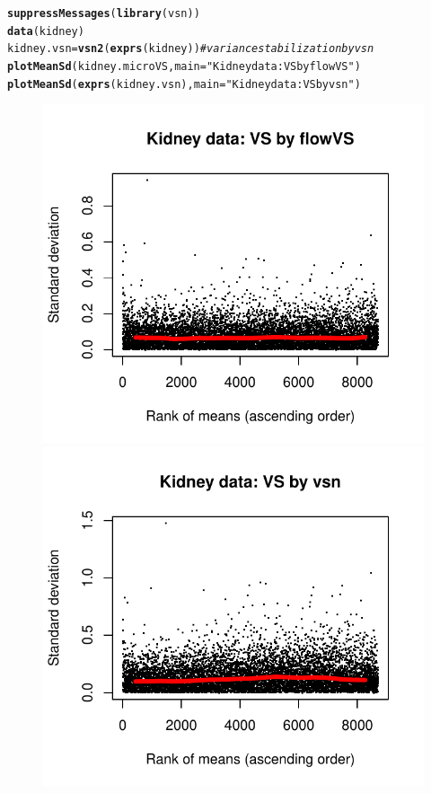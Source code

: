 \documentclass{article}\usepackage[]{graphicx}\usepackage[]{color}
\makeatletter
\def\maxwidth{ %
  \ifdim\Gin@nat@width>\linewidth
    \linewidth
  \else
    \Gin@nat@width
  \fi
}
\newcommand{\hlstr}[1]{\textcolor[rgb]{0.192,0.494,0.8}{#1}}%
\newcommand{\hlcom}[1]{\textcolor[rgb]{0.678,0.584,0.686}{\textit{#1}}}%
\newcommand{\hlstd}[1]{\textcolor[rgb]{0.345,0.345,0.345}{#1}}%
\newcommand{\hlkwb}[1]{\textcolor[rgb]{0.69,0.353,0.396}{#1}}%
\newcommand{\hlkwc}[1]{\textcolor[rgb]{0.333,0.667,0.333}{#1}}%
\newcommand{\hlkwd}[1]{\textcolor[rgb]{0.737,0.353,0.396}{\textbf{#1}}}%
\newenvironment{kframe}{%
 \def\at@end@of@kframe{}%
 \ifinner\ifhmode%
  \def\at@end@of@kframe{\end{minipage}}%
  \begin{minipage}{\columnwidth}%
 \fi\fi%
 \def\FrameCommand##1{\hskip\@totalleftmargin \hskip-\fboxsep
 \colorbox{shadecolor}{##1}\hskip-\fboxsep
     \hskip-\linewidth \hskip-\@totalleftmargin \hskip\columnwidth}%
 \MakeFramed {\advance\hsize-\width
   \@totalleftmargin\z@ \linewidth\hsize
   \@setminipage}}%
 {\par\unskip\endMakeFramed%
 \at@end@of@kframe}
\newenvironment{knitrout}{}{} %
\makeatother
\begin{document}
\begin{knitrout}
\color{fgcolor}\begin{kframe}
\begin{alltt}
\hlkwd{suppressMessages}\hlstd{(}\hlkwd{library}\hlstd{(vsn))}
\hlkwd{data}\hlstd{(kidney)}
\hlstd{kidney.vsn} \hlkwb{=} \hlkwd{vsn2}\hlstd{(}\hlkwd{exprs}\hlstd{(kidney))} \hlcom{#variance stabilization by vsn}
\hlkwd{plotMeanSd}\hlstd{(kidney.microVS,} \hlkwc{main}\hlstd{=}\hlstr{"Kidney data: VS by flowVS"}\hlstd{)}
\hlkwd{plotMeanSd}\hlstd{(}\hlkwd{exprs}\hlstd{(kidney.vsn),} \hlkwc{main}\hlstd{=}\hlstr{"Kidney data: VS by vsn"}\hlstd{)}
\end{alltt}
\end{kframe}\begin{figure}

{\centering \includegraphics[width=\maxwidth]{figure/vsn-1} 
\includegraphics[width=\maxwidth]{figure/vsn-2} 

}
\end{figure}
\end{knitrout}
\end{document}
